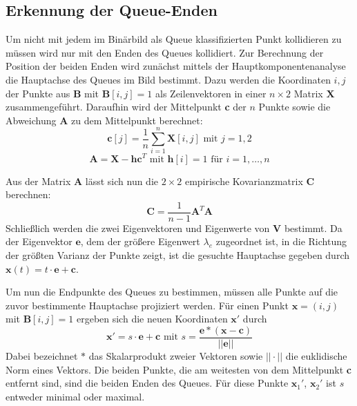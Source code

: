 \subsection{Erkennung der Queue-Enden}
Um nicht mit jedem im Binärbild als Queue klassifizierten Punkt kollidieren zu müssen wird nur mit den Enden des Queues kollidiert.
Zur Berechnung der Position der beiden Enden wird zunächst mittels der Hauptkomponentenanalyse \cite{OpenCV:PCA} die Hauptachse des Queues im Bild bestimmt. 
Dazu werden die Koordinaten $i, j$ der Punkte aus $\textbf{B}$ mit $\textbf{B}[i,j] = 1$ als Zeilenvektoren in einer $n \times 2$ Matrix $\textbf{X}$ zusammengeführt.
Daraufhin wird der Mittelpunkt \textbf{c} der $n$ Punkte sowie die Abweichung $\textbf{A}$ zu dem Mittelpunkt berechnet:
\begin{equation*}
\textbf{c}[j] = \frac{1}{n}\sum_{i=1}^{n}\textbf{X}[i, j]\text{ mit }j = 1, 2
\end{equation*}
\begin{equation*}
\textbf{A} = \textbf{X} - \textbf{h}\textbf{c}^T \text{ mit } \textbf{h}[i] = 1 \text{ für } i=1,\dots,n
\end{equation*}

Aus der Matrix \textbf{A} lässt sich nun die $2 \times 2$ empirische Kovarianzmatrix $\textbf{C}$ berechnen:
\begin{equation*}
	\textbf{C} = \frac{1}{n-1}\textbf{A}^{T}\textbf{A}
\end{equation*}
Schließlich werden die zwei Eigenvektoren und Eigenwerte von $\textbf{V}$ bestimmt. 
Da der Eigenvektor $\textbf{e}$, dem der größere Eigenwert $\lambda_e$ zugeordnet ist, in die Richtung der größten Varianz der Punkte zeigt, ist die gesuchte Hauptachse gegeben durch $\textbf{x}(t) = t \cdot \textbf{e} + \textbf{c}$.

Um nun die Endpunkte des Queues zu bestimmen, müssen alle Punkte auf die zuvor bestimmente Hauptachse projiziert werden.
Für einen Punkt $\textbf{x} = (i, j)$ mit $\textbf{B}[i,j] = 1$ ergeben sich die neuen Koordinaten $\textbf{x}'$ durch
\begin{equation*}
	\textbf{x}' = s \cdot \textbf{e} + \textbf{c}\text{ mit } s = \frac{\textbf{e} * (\textbf{x} - \textbf{c})}{||\textbf{e}||}
\end{equation*}
Dabei bezeichnet $*$ das Skalarprodukt zweier Vektoren sowie $||\cdot||$ die euklidische Norm eines Vektors.
Die beiden Punkte, die am weitesten von dem Mittelpunkt \textbf{c} entfernt sind, sind die beiden Enden des Queues. Für diese Punkte $\textbf{x}_1'$, $\textbf{x}_2'$ ist $s$ entweder minimal oder maximal. 

